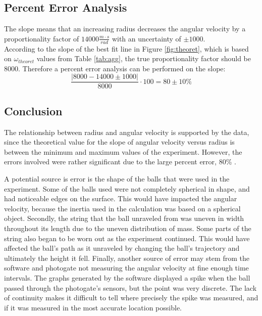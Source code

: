 \documentclass[10pt, letterpaper]{article}
\begin{document}
    \subsection{Percent Error Analysis}
    The slope means that an increasing radius decreases the angular velocity by a proportionality factor
    of $14000 \frac{m \cdot s}{rad}$ with an uncertainty of $\pm 1000$. \\

    According to the slope of the best fit line in Figure \ref{fig:theoret},
    which is based on $\omega _{theoret}$ values from Table \ref{tab:agg},
    the true proportionality factor should be 8000. Therefore a percent error analysis
    can be performed on the slope:
    \[ \frac{|8000 - 14000 \pm 1000|}{8000} \cdot 100 = 80 \pm 10 \% \]

    \subsection{Conclusion} \label{sec:conclusion}

    The relationship between radius and angular velocity is supported by the data, since the theoretical
    value for the slope of angular velocity versus radius is between the minimum and maximum
    values of the experiment. However, the errors involved were rather significant due to the large
    percent error, 80\% .

    A potential source is error is the shape of the balls that were used in the experiment. Some
    of the balls used were not completely spherical in shape, and had noticeable edges on the
    surface. This would have impacted the angular velocity, because the inertia used in the
    calculation was based on a spherical object. Secondly, the string that the ball unraveled
    from was uneven in width throughout its length due to the uneven distribution of mass. Some parts of the
    string also began to be worn out as the experiment continued. This would have affected the ball's path
    as it unraveled by changing the ball's trajectory and ultimately the height it fell.
    Finally, another source of error may stem from the software and photogate not measuring the
    angular velocity at fine enough time intervals. The graphs generated by the software displayed a
    spike when the ball passed through the photogate's sensors, but the point was very discrete. The lack
    of continuity makes it difficult to tell where precisely the spike was measured, and if it was
    measured in the most accurate location possible.
\end{document}
